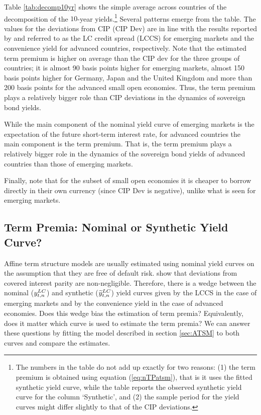 {Table \ref{tab:decomp10yr} shows the simple average across countries of the decomposition of the $10$-year yields.\footnote{The numbers in the table do not add up exactly for two reasons: (1) the term premium is obtained using equation (\ref{eq:nTPatsm}), that is it uses the fitted synthetic yield curve, while the table reports the observed synthetic yield curve for the column `Synthetic', and (2) the sample period for the yield curves might differ slightly to that of the CIP deviations.} Several patterns emerge from the table. The values for the deviations from CIP (CIP Dev) are in line with the results reported by \cite{DuSchreger:2016JoF} and \cite{DuImSchreger:2018JIE} referred to as the LC credit spread (LCCS) for emerging markets and the convenience yield for advanced countries, respectively. Note that the estimated term premium is higher on average than the CIP dev for the three groups of countries; it is almost 90 basis points higher for emerging markets, almost 150 basis points higher for Germany, Japan and the United Kingdom and more than 200 basis points for the advanced small open economies. Thus, the term premium plays a relatively bigger role than CIP deviations in the dynamics of sovereign bond yields. %
	
%	

While the main component of the nominal yield curve of emerging markets is the expectation of the future short-term interest rate, for advanced countries the main component is the term premium. That is, the term premium plays a relatively bigger role in the dynamics of the sovereign bond yields of advanced countries than those of emerging markets.

Finally, note that for the subset of small open economies it is cheaper to borrow directly in their own currency (since CIP Dev is negative), unlike what is seen for emerging markets.

\subsection{Term Premia: Nominal or Synthetic Yield Curve?}
Affine term structure models are usually estimated using nominal yield curves on the assumption that they are free of default risk. \cite{DuTepperVerdelhan:2018} show that deviations from covered interest parity are non-negligible. Therefore, there is a wedge between the nominal ($y_{t,n} ^{LC}$) and synthetic ($\widetilde{y}_{t,n} ^{LC}$) yield curves given by the LCCS in the case of emerging markets and by the convenience yield in the case of advanced economies. Does this wedge bias the estimation of term premia? Equivalently, does it matter which curve is used to estimate the term premia? We can answer these questions by fitting the model described in section \ref{sec:ATSM} to both curves and compare the estimates.

}
